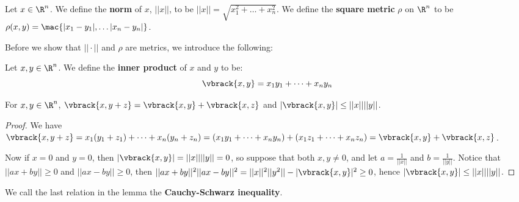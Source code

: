 \begin{definition}
    Let $x \in \R^n$. We define the \textbf {norm} of $x$,  $||x||$, to be
    $||x||=\sqrt{x_1^2+ \dots +x_n^2}$. We define the \textbf{square metric} $\rho$  on
    $\R^n$ to be  $\rho(x,y)=\mac\{|x_1-y_1|, \dots |x_n-y_n|\}$.
\end{definition}

Before we show that $||\cdot||$ and  $\rho$ are metrics, we introduce the following:

 \begin{definition}
    Let $x,y \in \R^n$. We define the \textbf{inner product} of $x$ and $y$ to be:
        \begin{equation}
            \vbrack{x,y}=x_1y_1+ \dots +x_ny_n
        \end{equation}
\end{definition}

\begin{lemma}\label{2.2.4}
    For $x,y \in \R^n$,  $\vbrack{x,y+z}=\vbrack{x,y}+\vbrack{x,z}$ and $|\vbrack{x,y}| \leq
    ||x||||y||$.
\end{lemma}
\begin{proof}
    We have $\vbrack{x,y+z}=x_1(y_1+z_1)+ \dots +x_n(y_n+z_n)=(x_1y_1 + \dots
    +x_ny_n)+(x_1z_1+ \dots +x_nz_n)=\vbrack{x,y}+\vbrack{x,z}$.

    Now if $x=0$ and  $y=0$, then  $|\vbrack{x,y}|=||x||||y||=0$, so suppose that both $x,y \neq 0$,
    and let  $a=\frac{1}{||x||}$ and $b=\frac{1}{||y||}$. Notice that $||ax+by|| \geq 0$ and
    $||ax-by|| \geq 0$, then $||ax+by||^2||ax-by||^2=||x||^2||y^2||-|\vbrack{x,y}|^2\geq 0$, hence
    $|\vbrack{x,y}| \leq ||x||||y||$.
\end{proof}
\begin{remark}
    We call the last relation in the lemma the \textbf{Cauchy-Schwarz inequality}.
\end{remark}

